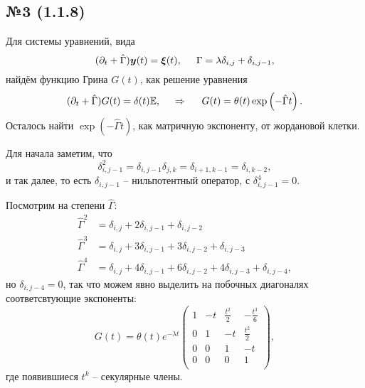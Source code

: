 \subsection*{№3 (1.1.8)}

Для системы уравнений, вида
\begin{equation*}
    (\partial_t + \hat{\Gamma}) \mbox{\boldmath $y$}(t)  = \mbox{\boldmath $\xi$}(t),
    \hspace{5 mm} 
    \Gamma = \lambda \delta_{i,j} + \delta_{i,j-1},
\end{equation*}
найдём функцию Грина $G(t)$, как решение уравнения
\begin{equation*}
    (\partial_t +   \hat{\Gamma}) G(t) = \delta(t) \mathbb{E},
    \hspace{0.5cm} \Rightarrow \hspace{0.5cm}
    G(t) = \theta(t) \exp\left(- \hat{\Gamma} t\right).
\end{equation*}
Осталось найти $\exp(-\hat{\Gamma} t)$, как матричную экспоненту, от жордановой клетки. 

Для начала заметим, что
\begin{equation*}
    \delta_{i,j-1}^2 = \delta_{i,j-1} \delta_{j, k} = \delta_{i+1, k-1} = \delta_{i, k-2},
\end{equation*}
и так далее, то есть $\delta_{i, j-1}$ -- нильпотентный оператор, с $\delta_{i, j-1}^4 = 0$.

Посмотрим на степени $\hat{\Gamma}$:
\begin{align*}
    \hat{\Gamma}^2 &= \delta_{i,j} + 2 \delta_{i,j-1} + \delta_{i, j-2} \\
    \hat{\Gamma}^3 &= \delta_{i,j} + 3 \delta_{i,j-1} + 3 \delta_{i, j-2} + \delta_{i, j-3}\\
    \hat{\Gamma}^4 &= \delta_{i,j} + 4 \delta_{i,j-1} + 6 \delta_{i, j-2} + 4\delta_{i, j-3} + 
    \delta_{i,j-4}, 
\end{align*}
но $\delta_{i,j-4} = 0$, так что можем явно выделить на побочных диагоналях соответсвтующие экспоненты:
\begin{equation*}
    G(t) = \theta(t) e^{- \lambda t} 
    \left(
        \begin{array}{cccc}
         1 & -t & \tfrac{t^2}{2} & -\tfrac{t^3}{6} \\
         0 & 1 & -t & \tfrac{t^2}{2} \\
         0 & 0 & 1 & -t \\
         0 & 0 & 0 & 1 \\
        \end{array}
    \right),
\end{equation*}
где появившиеся $t^k$ -- секулярные члены. 




